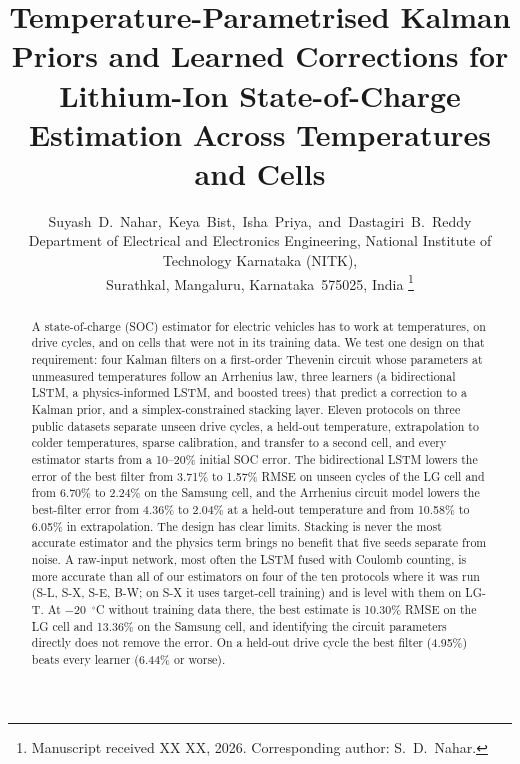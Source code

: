 \documentclass[journal]{IEEEtran}
\begin{document}
\title{Temperature-Parametrised Kalman Priors and Learned Corrections for Lithium-Ion State-of-Charge Estimation Across Temperatures and Cells}

\author{Suyash~D.~Nahar,~Keya~Bist,~Isha~Priya,~and~Dastagiri~B.~Reddy\\
\normalsize Department of Electrical and Electronics Engineering, National Institute of Technology Karnataka (NITK),\\
\normalsize Surathkal, Mangaluru, Karnataka~575025, India%
\thanks{Manuscript received XX XX, 2026. Corresponding author: S.~D.~Nahar.}}


\maketitle


\begin{abstract}
A state-of-charge (SOC) estimator for electric vehicles has to work at temperatures, on drive cycles, and on cells that were not in its training data. We test one design on that requirement: four Kalman filters on a first-order Thevenin circuit whose parameters at unmeasured temperatures follow an Arrhenius law, three learners (a bidirectional LSTM, a physics-informed LSTM, and boosted trees) that predict a correction to a Kalman prior, and a simplex-constrained stacking layer. Eleven protocols on three public datasets separate unseen drive cycles, a held-out temperature, extrapolation to colder temperatures, sparse calibration, and transfer to a second cell, and every estimator starts from a 10--20\% initial SOC error. The bidirectional LSTM lowers the error of the best filter from 3.71\% to 1.57\% RMSE on unseen cycles of the LG cell and from 6.70\% to 2.24\% on the Samsung cell, and the Arrhenius circuit model lowers the best-filter error from 4.36\% to 2.04\% at a held-out temperature and from 10.58\% to 6.05\% in extrapolation. The design has clear limits. Stacking is never the most accurate estimator and the physics term brings no benefit that five seeds separate from noise. A raw-input network, most often the LSTM fused with Coulomb counting, is more accurate than all of our estimators on four of the ten protocols where it was run (S-L, S-X, S-E, B-W; on S-X it uses target-cell training) and is level with them on LG-T. At $-20$~$^\circ$C without training data there, the best estimate is 10.30\% RMSE on the LG cell and 13.36\% on the Samsung cell, and identifying the circuit parameters directly does not remove the error. On a held-out drive cycle the best filter (4.95\%) beats every learner (6.44\% or worse).
\end{abstract}
\end{document}
